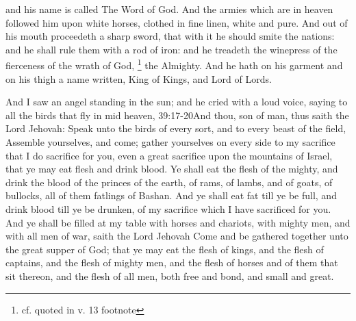  and his name is called The Word of God. 
And the armies which are in heaven followed him upon white horses, clothed in fine linen, white and pure. 
And out of his mouth proceedeth a sharp sword,%
 that with it he should smite the nations: and he shall rule them with a rod of iron:%
 and he treadeth the winepress of the fierceness of the wrath of God,%
	\footnote{cf.  quoted in v. 13 footnote}
 the Almighty. 
And he hath on his garment and on his thigh a name written, King of Kings, and Lord of Lords.%

And I saw an angel standing in the sun; and he cried with a loud voice, saying to all the birds that fly in mid heaven,%
							{39:17-20}{And thou, son of man, thus saith the Lord Jehovah: Speak unto the birds of every sort, and to every beast of the field, Assemble yourselves, and come; gather yourselves on every side to my sacrifice that I do sacrifice for you, even a great sacrifice upon the mountains of Israel, that ye may eat flesh and drink blood. Ye shall eat the flesh of the mighty, and drink the blood of the princes of the earth, of rams, of lambs, and of goats, of bullocks, all of them fatlings of Bashan. And ye shall eat fat till ye be full, and drink blood till ye be drunken, of my sacrifice which I have sacrificed for you. And ye shall be filled at my table with horses and chariots, with mighty men, and with all men of war, saith the Lord Jehovah}
 Come and be gathered together unto the great supper of God; 
that ye may eat the flesh of kings, and the flesh of captains, and the flesh of mighty men, and the flesh of horses and of them that sit thereon, and the flesh of all men, both free and bond, and small and great.

